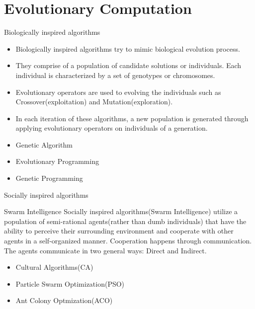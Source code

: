 \documentclass[table]{beamer}
\begin{document}
	\section{Evolutionary Computation}
	
	\begin{frame}{Biologically inspired algorithms}
		\begin{block}{}
			\begin{itemize}
			\justifying
			\item Biologically inspired algorithms try to mimic biological evolution process. \cite{man2012genetic}
			\item They comprise of a population of candidate solutions or individuals. Each individual is characterized by a set of genotypes or chromosomes. 
			\item Evolutionary operators are used to evolving the individuals such as \alert{Crossover}(exploitation) and \alert{Mutation}(exploration).
			\item In each iteration of these algorithms, a new population is generated through applying evolutionary operators on individuals of a generation.
			\end{itemize}
		\end{block}
		\begin{block}{}
			\begin{itemize}
				\item Genetic Algorithm
				\item Evolutionary Programming
				\item Genetic Programming				
			\end{itemize}
		\end{block}
	\end{frame}
	
	\begin{frame}{Socially inspired algorithms}
		\begin{block}{Swarm Intelligence}
			\justifying
			\cite{kennedy2001swarm} Socially inspired algorithms(Swarm Intelligence) utilize a population of semi-rational agents(rather than dumb individuals) that have the ability to perceive their surrounding environment and cooperate with other agents in a \alert{self-organized} manner. \newline Cooperation happens through communication. The agents communicate in two general ways: Direct and Indirect.
		\end{block}
		\begin{block}{}
			\begin{itemize}
				\item Cultural Algorithms(CA) \cite{reynolds1994introduction}
				\item Particle Swarm Optimization(PSO) \cite{clerc2010particle}
				\item Ant Colony Optmization(ACO) \cite{dorigo2006ant}
			\end{itemize}
		\end{block}
	\end{frame}
	
\end{document}
